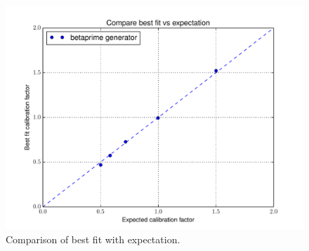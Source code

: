  \begin{figure}[htbp] \begin{center} 
\includegraphics[width=1.00\textwidth]{../FIGURES/105/FIG_Compare_best_fit_vs_expectation.pdf} 
\caption{Comparison of best fit with expectation.} 
\label{tab:extra_105} 
\end{center} \end{figure} 
\clearpage
 